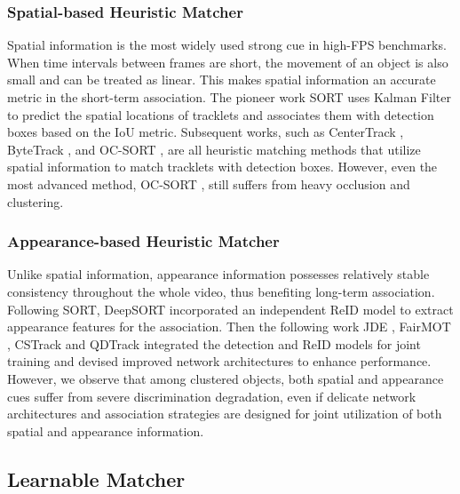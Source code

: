 \documentclass[letterpaper]{article} \usepackage{aaai23}  \usepackage{times}  \usepackage{helvet}  \usepackage{courier}  \usepackage[hyphens]{url}  \usepackage{graphicx} \urlstyle{rm} \def\UrlFont{\rm}  \usepackage{natbib}  \usepackage{caption} \frenchspacing  \setlength{\pdfpagewidth}{8.5in}  \setlength{\pdfpageheight}{11in}  \usepackage{algorithm}
\begin{document}
\subsubsection{Spatial-based Heuristic Matcher}
Spatial information is the most widely used strong cue in high-FPS benchmarks. When time intervals between frames are short, the movement of an object is also small and can be treated as linear. This makes spatial information an accurate metric in the short-term association. The pioneer work SORT \textcolor{blue}{\cite{bewley2016simple}} uses Kalman Filter \textcolor{blue}{\cite{kalman1960contributions}} to predict the spatial locations of tracklets and associates them with detection boxes based on the IoU metric. Subsequent works, such as CenterTrack \textcolor{blue}{\cite{zhou2020tracking}}, ByteTrack \textcolor{blue}{\cite{zhang2022bytetrack}}, and OC-SORT \textcolor{blue}{\cite{cao2023observation}}, are all heuristic matching methods that utilize spatial information to match tracklets with detection boxes. However, even the most advanced method, OC-SORT \textcolor{blue}{\cite{cao2023observation}}, still suffers from heavy occlusion and clustering. 

\subsubsection{Appearance-based Heuristic Matcher}
Unlike spatial information, appearance information possesses relatively stable consistency throughout the whole video, thus benefiting long-term association. Following SORT, DeepSORT \textcolor{blue}{\cite{wojke2017simple}} incorporated an independent ReID model to extract appearance features for the association. Then the following work JDE \textcolor{blue}{\cite{wang2020towards}}, FairMOT \textcolor{blue}{\cite{zhang2021fairmot}}, CSTrack \textcolor{blue}{\cite{liang2022rethinking}} and QDTrack \textcolor{blue}{\cite{pang2021quasi}} integrated the detection and ReID models for joint training and devised improved network architectures to enhance performance. However, we observe that among clustered objects, both spatial and appearance cues suffer from severe discrimination degradation, even if delicate network architectures and association strategies are designed for joint utilization of both spatial and appearance information. 





\subsection{Learnable Matcher}
\end{document}
